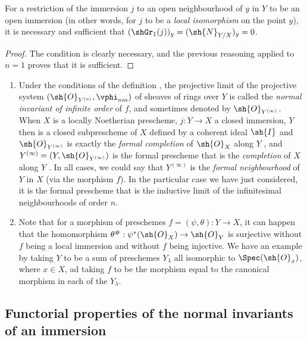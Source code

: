 \begin{corollary}[16.1.10]
\label{IV.16.1.10}
For a restriction of the immersion $j$ to an open neighbourhood of $y$ in $Y$ to be an open immersion (in other words, for $j$ to be a \emph{local isomorphism} on the point $y$), it is necessary and sufficient that $(\shGr_1(j))_y = (\sh{N}_{Y/X})_y = 0$.
\end{corollary}

\begin{proof}
The condition is clearly necessary, and the previous reasoning applied to $n=1$ proves that it is sufficient.
\end{proof}

\begin{remark}[16.1.11]
\label{IV.16.1.11}
\medskip\noindent
\begin{enumerate}
  \item[(i)] Under the conditions of the definition , the projective limit of the projective system $(\sh{O}_{Y^{(n)}}, \vphi_{nm})$ of sheaves of rings over $Y$ is called the \emph{normal invariant of infinite order} of $f$, and sometimes denoted by $\sh{O}_{Y^{(\infty)}}$.
  When $X$ is a locally Noetherian prescheme, $j:Y \to X$ a closed immersion, $Y$ then is a closed subprescheme of $X$ defined by a coherent ideal $\sh{I}$ and $\sh{O}_{Y^{(\infty)}}$ is exactly the \emph{formal completion} of $\sh{O}_X$ along $Y$ , and $Y^{(\infty)} = (Y, \sh{O}_{Y^{(\infty)}})$ is the formal prescheme that is the \emph{completion} of $X$ along $Y$ .
  In all cases, we could say that $Y^{(\infty)}$ is the \emph{formal neighbourhood} of $Y$ in $X$ (via the morphism $f$).
  In the particular case we have just considered, it is the formal prescheme that is the inductive limit of the infinitesimal neighbourhoods of order $n$.
  \item[(ii)] Note that for a morphism of preschemes $f=(\psi, \theta): Y \to X$, it can happen that the homomorphism $\theta^\#:\psi^*(\sh{O}_X) \to \sh{O}_Y$ is surjective without $f$ being a local 
  immersion and without $f$ being injective.
  We have an example by taking $Y$ to be a sum of preschemes $Y_\lambda$ all isomorphic to $\Spec(\sh{O}_x)$, where $x \in X$, ad taking $f$ to be the morphism equal to the canonical morphism in each of the $Y_\lambda$.
\end{enumerate}
\end{remark}

\subsection{Functorial properties of the normal invariants of an immersion}
\label{IV.16.2}

